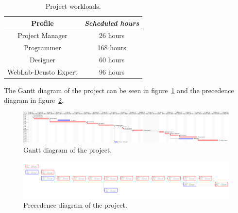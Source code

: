 \begin{table}[h]
	\centering
	\caption{Project workloads.}\label{tab:work}
	\begin{tabular}{cc}
		\toprule
		\textbf{Profile} & \emph{Scheduled hours} \\
		\midrule
		Project Manager			&	26 hours	\\
		Programmer				&	168 hours	\\
		Designer				&	60 hours	\\
		WebLab-Deusto Expert	&	96 hours	\\
		\bottomrule
	\end{tabular}
\end{table}

The Gantt diagram of the project can be seen in figure~\ref{fig:gantt} and the precedence diagram in
figure~\ref{fig:precedence}.

\begin{figure}
	\centering
	\includegraphics[width=0.95\textheight, angle=90]{fig/gantt}
	\caption{Gantt diagram of the project.}\label{fig:gantt}
\end{figure}

\begin{figure}
	\centering
	\includegraphics[width=0.95\textheight, angle=90]{fig/precedence}
	\caption{Precedence diagram of the project.}\label{fig:precedence}
\end{figure}
